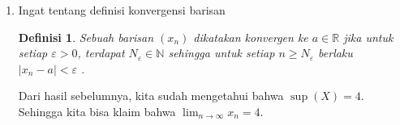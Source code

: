 \documentclass[10pt,openany,a4paper]{article}
\newcommand{\R}{\mathbb{R}}
\newcommand{\N}{\mathbb{N}}
\newtheorem*{teorema}{Teorema}
\newtheorem*{definisi}{Definisi}
\begin{document}
\begin{enumerate}
\begin{enumerate}
\begin{itemize}
            \item Kedua kita akan buktikan bahwa $\sup(X)=4$.
            \begin{teorema}
                Misalkan $H$ adalah himpunan tak kosong dari $\R$. Sebuah bilangan $b\in\R$ dikatakan sebagai supremum dari $H$ jika
                \begin{enumerate}
                    \item $b\geq x$ untuk setiap $x\in H$.
                    \item Untuk setiap $\varepsilon>0$, terdapat $x\in H$ sehingga $b-\varepsilon<x\leq b$.\\
                \end{enumerate}
            \end{teorema}
            Menggunakan teorema di atas, diperloleh
            \begin{enumerate}
                \item Dari hasil (a), jelas bahwa $4$ adalah batas atas dari barisan $X$.
                \item Dengan sifat Archimedes, didapatkan untuk setiap $\varepsilon>0$ selalu terdapat $n_\varepsilon\in\N$ sehingga $\frac{1}{n_\varepsilon}<\varepsilon$. Informasi tersebut dapat digunakan sebagai berikut 
                \[\left(2-\frac{1}{n_\varepsilon}\right)^2=4-\frac{4}{n_\varepsilon}+\frac{1}{n^2_\varepsilon}>4-\frac{4}{n_\varepsilon}\]
                Pilih $n_\varepsilon=\dfrac{4}{\varepsilon}$, sehingga
                \[4-\frac{4}{n_\varepsilon}>4-\varepsilon\]
                Hal ini menunjukkan terdapat $x=\left(2-\frac{1}{n_\varepsilon}\right)^2\in X$ sehingga $4-\varepsilon<x\leq 4$.\\
            \end{enumerate}

            $\therefore$ Terbukti $\sup(X)=4$.
        \end{itemize}
        \item Ingat tentang definisi konvergensi barisan
        \begin{definisi}
            Sebuah barisan $(x_n)$ dikatakan konvergen ke $a\in\R$ jika untuk setiap $\varepsilon>0$, terdapat $N_\varepsilon\in\N$ sehingga untuk setiap $n\geq N_\varepsilon$ berlaku $|x_n-a|<\varepsilon$ .
        \end{definisi}
        Dari hasil sebelumnya, kita sudah mengetahui bahwa $\sup(X)=4$. Sehingga kita bisa klaim bahwa $\lim_{n\to\infty}x_n=4$.\\


\end{enumerate}
\end{enumerate}
\end{document}
